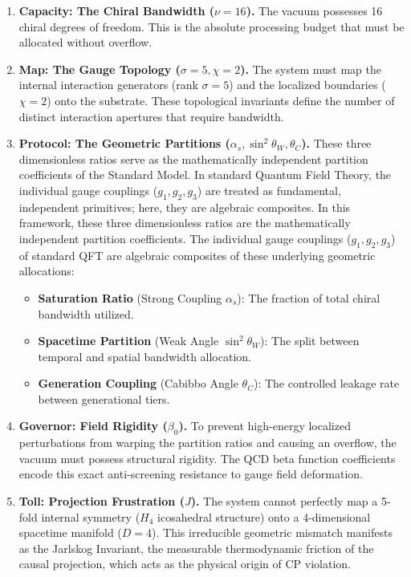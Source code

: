 \begin{enumerate}
    \item \textbf{Capacity: The Chiral Bandwidth ($\nu = 16$).} 
    The vacuum possesses 16 chiral degrees of freedom. This is the absolute processing budget that must be allocated without overflow.
    
    \item \textbf{Map: The Gauge Topology ($\sigma=5, \chi=2$).} 
    The system must map the internal interaction generators (rank $\sigma=5$) and the localized boundaries ($\chi=2$) onto the substrate. These topological invariants define the number of distinct interaction apertures that require bandwidth.
        
    \item \textbf{Protocol: The Geometric Partitions ($\alpha_s, \sin^2\theta_W, \theta_C$).}
    These three dimensionless ratios serve as the mathematically independent partition coefficients of the Standard Model. In standard Quantum Field Theory, the individual gauge couplings ($g_1, g_2, g_3$) are treated as fundamental, independent primitives; here, they are algebraic composites. 
    In this framework, these three dimensionless ratios are the mathematically independent partition coefficients. The individual gauge couplings ($g_1, g_2, g_3$) of standard QFT are algebraic composites of these underlying geometric allocations:

    \begin{itemize}
        \item \textbf{Saturation Ratio} (Strong Coupling $\alpha_s$): The fraction of total chiral bandwidth utilized.
        \item \textbf{Spacetime Partition} (Weak Angle $\sin^2\theta_W$): The split between temporal and spatial bandwidth allocation.
        \item \textbf{Generation Coupling} (Cabibbo Angle $\theta_C$): The controlled leakage rate between generational tiers.
    \end{itemize}
    
    \item \textbf{Governor: Field Rigidity ($\beta_0$).} 
    To prevent high-energy localized perturbations from warping the partition ratios and causing an overflow, the vacuum must possess structural rigidity. The QCD beta function coefficients encode this exact anti-screening resistance to gauge field deformation.
 
    \item \textbf{Toll: Projection Frustration ($J$).} 
    The system cannot perfectly map a 5-fold internal symmetry ($H_4$ icosahedral structure) onto a 4-dimensional spacetime manifold ($D=4$). This irreducible geometric mismatch manifests as the Jarlskog Invariant, the measurable thermodynamic friction of the causal projection, which acts as the physical origin of CP violation.


\end{enumerate}
